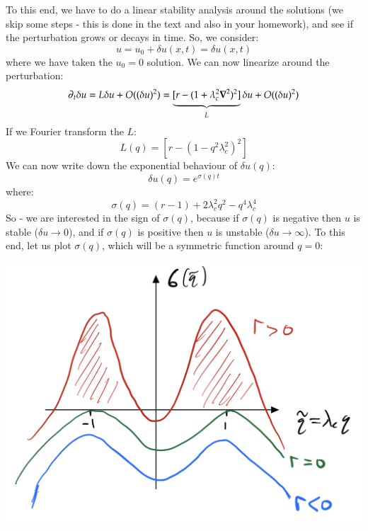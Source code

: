 To this end, we have to do a linear stability analysis around the solutions (we skip some steps - this is done in the text and also in your homework), and see if the perturbation grows or decays in time. So, we consider:
\begin{equation}
    u = u_0 + \delta u(x, t) = \delta u(x, t)
\end{equation}
where we have taken the $u_0 = 0$ solution. We can now linearize around the perturbation:
\begin{equation}
    \p_t \delta u = L\delta u + O((\delta u)^2) = \underbrace{[r - (1 + \lambda_c^2\nabla^2)^2]}_{L}\delta u + O((\delta u)^2)
\end{equation}
If we Fourier transform the $L$:
\begin{equation}
    L(q) = [r - (1 - q^2\lambda_c^2)^2]
\end{equation}
We can now write down the exponential behaviour of $\delta u(q)$:
\begin{equation}
    \delta u(q) = e^{\sigma(q) t}
\end{equation}
where:
\begin{equation}
    \sigma(q) = (r - 1) + 2\lambda_c^2 q^2 - q^4\lambda_c^4
\end{equation}
So - we are interested in the sign of $\sigma(q)$, because if $\sigma(q)$ is negative then $u$ is stable ($\delta u \to 0$), and if $\sigma(q)$ is positive then $u$ is unstable ($\delta u \to \infty$). To this end, let us plot $\sigma(q)$, which will be a symmetric function around $q = 0$:

\begin{center}
    \includegraphics[scale=0.3]{Lectures/Images/lec18-sigmaq.png}
\end{center}

